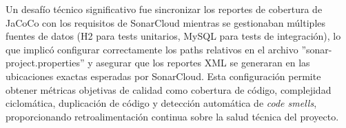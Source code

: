 Un desafío técnico significativo fue sincronizar los reportes de cobertura de JaCoCo con los requisitos de SonarCloud mientras se gestionaban múltiples fuentes de datos (H2 para tests unitarios, MySQL para tests de integración), lo que implicó configurar correctamente los paths relativos en el archivo ''sonar-project.properties'' y asegurar que los reportes XML se generaran en las ubicaciones exactas esperadas por SonarCloud. Esta configuración permite obtener métricas objetivas de calidad como cobertura de código, complejidad ciclomática, duplicación de código y detección automática de \emph{code smells}, proporcionando retroalimentación continua sobre la salud técnica del proyecto.

